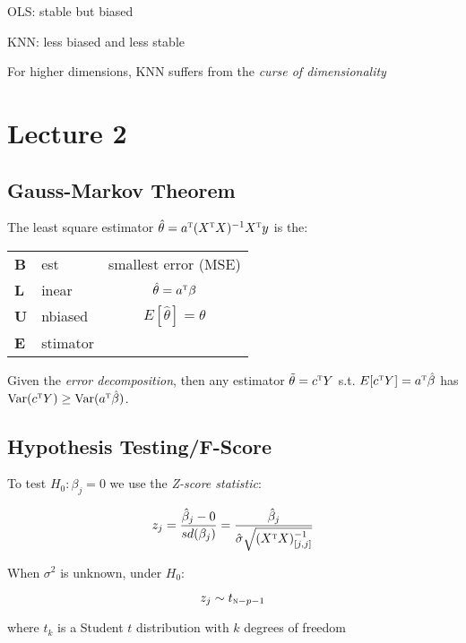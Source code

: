 \documentclass[twoside,twocolumn,10pt]{revtex4-1}
\begin{document}
	OLS: stable but biased
	
	KNN: less biased and less stable
	
	For higher dimensions, KNN suffers from the \textit{curse of dimensionality}
	
	\section{Lecture 2}
	
	\subsection{Gauss-Markov Theorem}
	
	The least square estimator $\hat{\theta} = a^\textsc{t}(X^\textsc{t}X)^{-1}X^\textsc{t}y$ is the:
	
	\begin{tabular}{l l c}
	\textbf{B} & est & smallest error (MSE) \\
	\textbf{L} & inear & $\hat{\theta} = a^\textsc{t} \beta$ \\
	\textbf{U} & nbiased & $E[\hat{\theta}] = \theta$ \\
	\textbf{E} & stimator &
	\end{tabular}
	
	Given the \textit{error decomposition}, then any estimator $\tilde{\theta} = c^\textsc{t}Y$ s.t. $E[c^\textsc{t}Y] = a^\textsc{t} \hat{\beta}$ has $\text{Var}(c^\textsc{t}Y) \geq \text{Var}(a^\textsc{t}\hat{\beta})$.
	
	\subsection{Hypothesis Testing/F-Score}
	
	To test $H_0 : \beta_j = 0$ we use the \textit{Z-score statistic}:
	
	\begin{equation*}
	z_j = \frac{\hat{\beta}_j - 0}{sd(\beta_j)} = \frac{\hat{\beta}_j}{\hat{\sigma} \sqrt{(X^\textsc{t}X)_{[j,j]}^{-1}}}
	\end{equation*}
	
	When $\sigma^2$ is unknown, under $H_0$:
	
	\begin{equation*}
	z_j \sim t_{\textsc{n}-p-1}
	\end{equation*}
	
	where $t_k$ is a Student $t$ distribution with $k$ degrees of freedom
	
\end{document}
